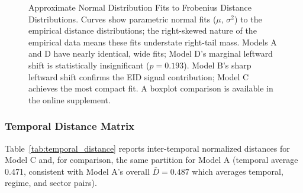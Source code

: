 \documentclass[12pt]{article}
\begin{document}
\begin{figure}[H]
\centering
{}
\caption{Approximate Normal Distribution Fits to Frobenius Distance
Distributions. Curves show parametric normal fits ($\mu$, $\sigma^2$)
to the empirical distance distributions; the right-skewed nature of
the empirical data means these fits understate right-tail mass.
Models A and D have nearly identical, wide fits; Model D's marginal
leftward shift is statistically insignificant ($p=0.193$). Model B's
sharp leftward shift confirms the EID signal contribution; Model C
achieves the most compact fit. A boxplot comparison is available in
the online supplement.}
\label{fig:frobenius_dist}
\end{figure}

\subsubsection{Temporal Distance Matrix}

Table~\ref{tab:temporal_distance} reports inter-temporal normalized
distances for Model C and, for comparison, the same partition for
Model A (temporal average 0.471, consistent with Model A's overall
$\bar{D}=0.487$ which averages temporal, regime, and sector pairs).
\end{document}
